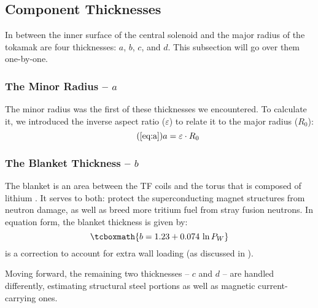 \subsection{ Component Thicknesses}

In between the inner surface of the central solenoid and the major radius of the tokamak are four thicknesses: $a$, $b$, $c$, and $d$. This subsection will go over them one-by-one.

\subsubsection{The Minor Radius -- $a$}

The minor radius was the first of these thicknesses we encountered. To calculate it, we introduced the inverse aspect ratio ($\varepsilon$) to relate it to the major radius ($R_0$):
\begin{equation}
	\tag{\ref{eq:a}}
	a = \varepsilon \cdot R_0
\end{equation}

\subsubsection{The Blanket Thickness -- $b$}

The blanket is an area between the TF coils and the torus that is composed  of lithium . It serves to both: protect the superconducting magnet structures from neutron damage, as well as breed more tritium fuel from stray fusion neutrons.\cite{blanket} In equation form, the blanket thickness is given by: \cite{minervini}
\begin{equation}
	\label{eq:bb}
	\tcboxmath{
	b = 1.23 + 0.074 \ \textnormal{ln} \, P_W
	}
\end{equation}
 is a correction to account for extra wall loading (as discussed in ).

Moving forward, the remaining two thicknesses -- $c$ and $d$ -- are handled differently, estimating structural steel portions as well as magnetic current-carrying ones.

